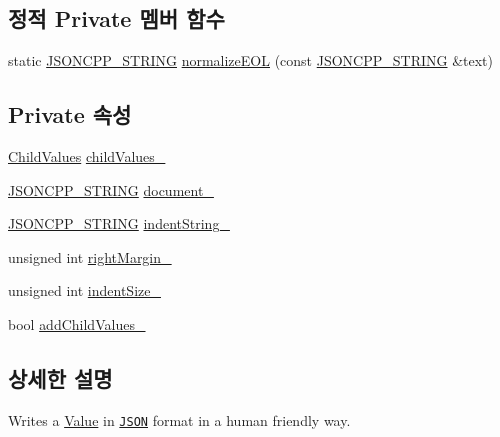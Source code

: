 \subsection*{정적 Private 멤버 함수}
\begin{DoxyCompactItemize}
\item 
static \hyperlink{json_8h_a1e723f95759de062585bc4a8fd3fa4be}{J\+S\+O\+N\+C\+P\+P\+\_\+\+S\+T\+R\+I\+NG} \hyperlink{class_json_1_1_styled_writer_a692dda1b1621fb5620e0a7b1b10f3b1f}{normalize\+E\+OL} (const \hyperlink{json_8h_a1e723f95759de062585bc4a8fd3fa4be}{J\+S\+O\+N\+C\+P\+P\+\_\+\+S\+T\+R\+I\+NG} \&text)
\end{DoxyCompactItemize}
\subsection*{Private 속성}
\begin{DoxyCompactItemize}
\item 
\hyperlink{class_json_1_1_styled_writer_a798fcefa41730de612a5cf7e73003e8a}{Child\+Values} \hyperlink{class_json_1_1_styled_writer_a1f905495f0705365af117ec541e29fdf}{child\+Values\+\_\+}
\item 
\hyperlink{json_8h_a1e723f95759de062585bc4a8fd3fa4be}{J\+S\+O\+N\+C\+P\+P\+\_\+\+S\+T\+R\+I\+NG} \hyperlink{class_json_1_1_styled_writer_ae967b0c77e4d7cb889ce7b6ee4ce28d7}{document\+\_\+}
\item 
\hyperlink{json_8h_a1e723f95759de062585bc4a8fd3fa4be}{J\+S\+O\+N\+C\+P\+P\+\_\+\+S\+T\+R\+I\+NG} \hyperlink{class_json_1_1_styled_writer_a7d91709c94c152bd44eaf80faac130ae}{indent\+String\+\_\+}
\item 
unsigned int \hyperlink{class_json_1_1_styled_writer_ae648d2e1fc0f7d45c748c96805106cb0}{right\+Margin\+\_\+}
\item 
unsigned int \hyperlink{class_json_1_1_styled_writer_a0b5ab768cc56433d463eb1f03da8614e}{indent\+Size\+\_\+}
\item 
bool \hyperlink{class_json_1_1_styled_writer_acaabfa48b50a8bb7fa9ce98e2ae971d9}{add\+Child\+Values\+\_\+}
\end{DoxyCompactItemize}


\subsection{상세한 설명}
Writes a \hyperlink{class_json_1_1_value}{Value} in \href{http://www.json.org}{\tt J\+S\+ON} format in a human friendly way. 

